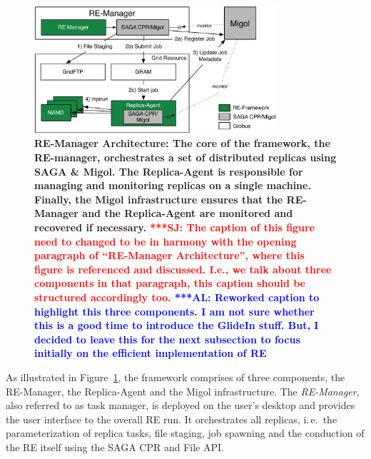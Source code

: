\documentclass{rspublic}
\newcommand{\alnote}[1]{ {\textcolor{blue} { ***AL: #1 }}}
\newcommand{\jhanote}[1]{ {\textcolor{red} { ***SJ: #1 }}}
\newcommand{\alnote}[1]{}
\newcommand{\jhanote}[1]{}
\begin{document}
\begin{figure}[t]
      \centering
          \includegraphics[width=0.8\textwidth]{REMDgManager-architecture.pdf}
          \caption{\footnotesize \bf RE-Manager Architecture: The
            core of the framework, the RE-manager, orchestrates 
            a set of distributed replicas using SAGA \& Migol. 
            The Replica-Agent is responsible for managing and monitoring 
            replicas on a single machine. Finally, the Migol 
            infrastructure ensures that the RE-Manager and the Replica-Agent 
            are monitored and recovered if necessary.            
            \jhanote{The caption of this
              figure need to changed to be in harmony with the opening
              paragraph of ``RE-Manager Architecture'', where this
              figure is referenced and discussed. I.e., we talk about
              three components in that paragraph, this caption should
              be structured accordingly too.}
              \alnote{Reworked caption to highlight this three components. 
              I am not sure whether this is a good time to introduce the GlideIn stuff. But, I 
              decided to leave this for the next subsection to focus initially on
              the efficient implementation of RE}
              }
      \label{fig:REMD-Manager-architecture}
\end{figure}

As illustrated in Figure~\ref{fig:REMD-Manager-architecture}, the
framework comprises of three components, the RE-Manager,
the Replica-Agent and the Migol infrastructure. 
The  \emph{RE-Manager}, also referred to as task manager,
is deployed on the user's desktop and provides the user interface 
to the overall RE run. It orchestrates all replicas, i.\,e.\ the 
parameterization of replica  tasks, file staging, job spawning 
and the conduction of the RE itself using the SAGA CPR
and File API.                                                                
\end{document}
